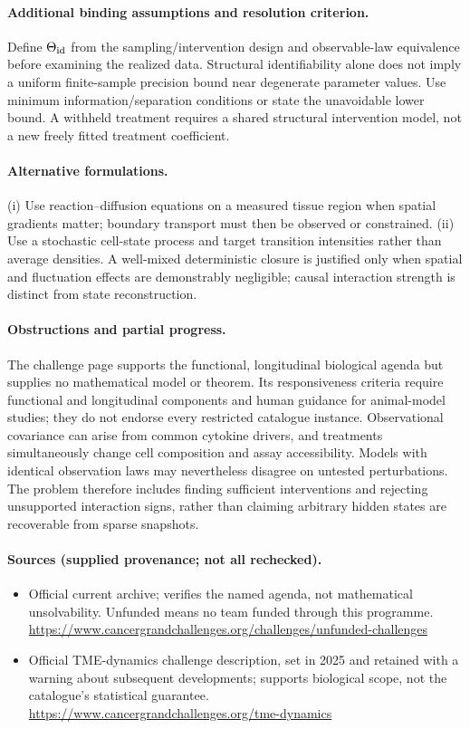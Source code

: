 \documentclass[11pt]{article}
\begin{document}
\paragraph{Additional binding assumptions and resolution criterion.} Define $\Theta_{\rm id}$ from the sampling/intervention design and observable-law equivalence before examining the realized data. Structural identifiability alone does not imply a uniform finite-sample precision bound near degenerate parameter values. Use minimum information/separation conditions or state the unavoidable lower bound. A withheld treatment requires a shared structural intervention model, not a new freely fitted treatment coefficient.

\paragraph{Alternative formulations.} (i) Use reaction--diffusion equations on a measured tissue region when spatial gradients matter; boundary transport must then be observed or constrained. (ii) Use a stochastic cell-state process and target transition intensities rather than average densities. A well-mixed deterministic closure is justified only when spatial and fluctuation effects are demonstrably negligible; causal interaction strength is distinct from state reconstruction.

\paragraph{Obstructions and partial progress.} The challenge page supports the functional, longitudinal biological agenda but supplies no mathematical model or theorem. Its responsiveness criteria require functional and longitudinal components and human guidance for animal-model studies; they do not endorse every restricted catalogue instance. Observational covariance can arise from common cytokine drivers, and treatments simultaneously change cell composition and assay accessibility. Models with identical observation laws may nevertheless disagree on untested perturbations. The problem therefore includes finding sufficient interventions and rejecting unsupported interaction signs, rather than claiming arbitrary hidden states are recoverable from sparse snapshots.

\paragraph{Sources (supplied provenance; not all rechecked).} \begin{itemize}
\item Official current archive; verifies the named agenda, not mathematical unsolvability. Unfunded means no team funded through this programme. \url{https://www.cancergrandchallenges.org/challenges/unfunded-challenges}
\item[S1] Official TME-dynamics challenge description, set in 2025 and retained with a warning about subsequent developments; supports biological scope, not the catalogue's statistical guarantee. \url{https://www.cancergrandchallenges.org/tme-dynamics}
\end{itemize}
\end{document}
